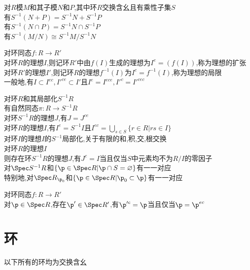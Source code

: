 \begin{dingli}
对$R$模$M$和其子模$N$和$P$,其中环$R$交换含幺且有乘性子集$S$\\
有$S^{-1}(N+P)=S^{-1}N+S^{-1}P$\\
有$S^{-1}(N\cap P)=S^{-1}N\cap S^{-1}P$\\
有$S^{-1}(M/N)\cong S^{-1}M/S^{-1}N$
\end{dingli}

\begin{dingyi}
对环同态$f:R\to R'$\\
对环$R$的理想$I$,则记环$R'$中由$f(I)$生成的理想为$I^{e}=(f(I))$,称为理想的扩张\\
对环$R'$的理想$I'$,则记环$R$的理想$f^{-1}(I)$为$I^{c}=f^{-1}(I)$,称为理想的局限\\
一般地,有$I\subset I^{ec},I'^{ce}\subset I'$且$I^{e}=I^{ece},I'^{c}=I'^{cec}$
\end{dingyi}

\begin{dingli}
对环$R$和其局部化$S^{-1}R$\\
有自然同态$\pi:R\to S^{-1}R$\\
对环$S^{-1}R$的理想$J$,有$J=J^{ce}$\\
对环$R$的理想$I$,有$I^{e}=S^{-1}I$且$I^{ec}=\bigcup\limits_{s\in S}\{r\in R|rs\in I\}$\\
对环$I$的理想$I$的$S^{-1}$局部化,关于有限的和,积,交,根交换\\
对环$R$的理想$I$\\
则存在环$S^{-1}R$的理想$J$,有$J^{c}=I$当且仅当$S$中元素均不为$R/I$的零因子\\
对$\Spec S^{-1}R$和$\{\p\in \Spec R|\p\cap S=\varnothing\}$有一一对应\\
特别地,对$\Spec R_{\p_0}$和$\{\p\in \Spec R|\p_0\subset\p\}$有一一对应
\end{dingli}

\begin{tuilun}
对环同态$f:R\to R'$\\
对$\p\in \Spec R$,存在$\p'\in \Spec R'$,有$\p'^{c}=\p$当且仅当$\p=\p^{ec}$
\end{tuilun}

\chapter{环}

\begin{zhu}
以下所有的环均为交换含幺
\end{zhu}


